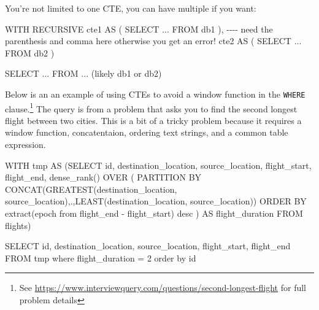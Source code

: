 \documentclass[
  letterpaper,
  DIV=11,
  numbers=noendperiod]{scrreprt}
\newenvironment{Shaded}{\begin{snugshade}}{\end{snugshade}}
\newcommand{\CommentTok}[1]{\textcolor[rgb]{0.37,0.37,0.37}{#1}}
\newcommand{\DecValTok}[1]{\textcolor[rgb]{0.68,0.00,0.00}{#1}}
\newcommand{\FunctionTok}[1]{\textcolor[rgb]{0.28,0.35,0.67}{#1}}
\newcommand{\KeywordTok}[1]{\textcolor[rgb]{0.00,0.23,0.31}{#1}}
\newcommand{\NormalTok}[1]{\textcolor[rgb]{0.00,0.23,0.31}{#1}}
\newcommand{\OperatorTok}[1]{\textcolor[rgb]{0.37,0.37,0.37}{#1}}
\newcommand{\StringTok}[1]{\textcolor[rgb]{0.13,0.47,0.30}{#1}}
\begin{document}
You're not limited to one CTE, you can have multiple if you want:

\begin{Shaded}
\begin{Highlighting}[]
\KeywordTok{WITH}\NormalTok{ RECURSIVE cte1 }\KeywordTok{AS}\NormalTok{ (}
\KeywordTok{SELECT} \OperatorTok{..}\NormalTok{.}
\KeywordTok{FROM}\NormalTok{ db1}
\NormalTok{), }\CommentTok{{-}{-}{-}{-} need the parenthesis and comma here otherwise you get an error!}
\NormalTok{cte2 }\KeywordTok{AS}\NormalTok{ (}
\KeywordTok{SELECT} \OperatorTok{..}\NormalTok{.}
\KeywordTok{FROM}\NormalTok{ db2}
\NormalTok{)}

\KeywordTok{SELECT} \OperatorTok{..}\NormalTok{.}
\KeywordTok{FROM} \OperatorTok{..}\NormalTok{. (likely db1 }\KeywordTok{or}\NormalTok{ db2)}
\end{Highlighting}
\end{Shaded}

Below is an an example of using CTEs to avoid a window function in the
\texttt{WHERE} clause.\footnote{See
  \url{https://www.interviewquery.com/questions/second-longest-flight}
  for full problem details} The query is from a problem that asks you to
find the second longest flight between two cities. This is a bit of a
tricky problem because it requires a window function, concatentaion,
ordering text strings, and a common table expression.

\begin{Shaded}
\begin{Highlighting}[]
\KeywordTok{WITH}\NormalTok{ tmp }\KeywordTok{AS}\NormalTok{ (}\KeywordTok{SELECT} 
\KeywordTok{id}\NormalTok{, }
\NormalTok{destination\_location,}
\NormalTok{source\_location,}
\NormalTok{flight\_start,}
\NormalTok{flight\_end,}
\FunctionTok{dense\_rank}\NormalTok{() }\KeywordTok{OVER}\NormalTok{ (}
    \KeywordTok{PARTITION} \KeywordTok{BY} \FunctionTok{CONCAT}\NormalTok{(}\FunctionTok{GREATEST}\NormalTok{(destination\_location, source\_location),}\StringTok{\textquotesingle{}.\textquotesingle{}}\NormalTok{,}\FunctionTok{LEAST}\NormalTok{(destination\_location, source\_location))}
    \KeywordTok{ORDER} \KeywordTok{BY} \FunctionTok{extract}\NormalTok{(epoch }\KeywordTok{from}\NormalTok{ flight\_end }\OperatorTok{{-}}\NormalTok{ flight\_start) }\KeywordTok{desc}
\NormalTok{) }\KeywordTok{AS}\NormalTok{ flight\_duration}
\KeywordTok{FROM}\NormalTok{ flights)}

\KeywordTok{SELECT} \KeywordTok{id}\NormalTok{, destination\_location, source\_location, flight\_start, flight\_end}
\KeywordTok{FROM}\NormalTok{ tmp}
\KeywordTok{where}\NormalTok{ flight\_duration }\OperatorTok{=} \DecValTok{2}
\KeywordTok{order} \KeywordTok{by} \KeywordTok{id}
\end{Highlighting}
\end{Shaded}
\end{document}
